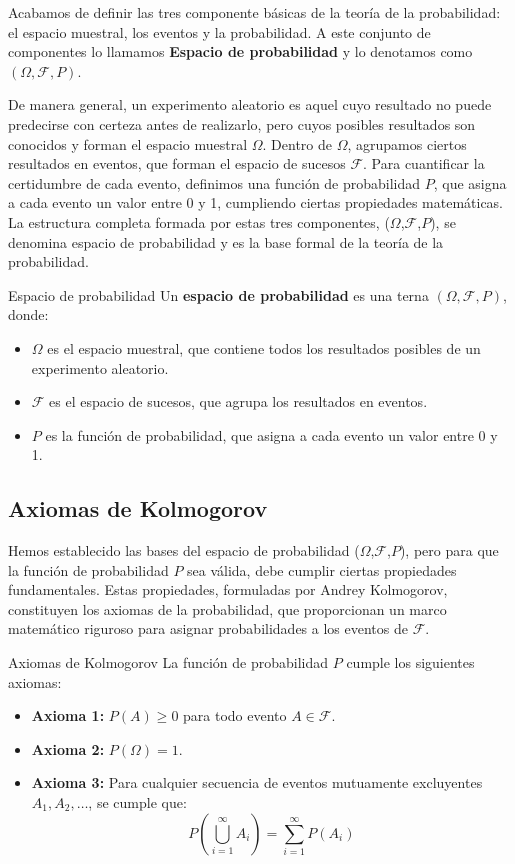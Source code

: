Acabamos de definir las tres componente básicas de la teoría de la probabilidad: el espacio muestral, los eventos y la probabilidad. A este
conjunto de componentes lo llamamos \textbf{Espacio de probabilidad} y lo denotamos como $(\Omega, \mathcal{F}, P)$.

De manera general, un experimento aleatorio es aquel cuyo resultado no puede predecirse con certeza antes de realizarlo, pero cuyos posibles resultados son conocidos y forman el espacio muestral $\Omega$. Dentro de $\Omega$, agrupamos ciertos resultados en eventos, que forman el espacio de sucesos $\mathcal{F}$. Para cuantificar la certidumbre de cada evento, definimos una función de probabilidad $P$, que asigna a cada evento un valor entre 0 y 1, cumpliendo ciertas propiedades matemáticas. La estructura completa formada por estas tres componentes, ($\Omega$,$\mathcal{F}$,$P$), se denomina espacio de probabilidad y es la base formal de la teoría de la probabilidad.

\begin{definicion}{Espacio de probabilidad}
Un \textbf{espacio de probabilidad} es una terna $(\Omega, \mathcal{F}, P)$, donde:

\begin{itemize}
    \item $\Omega$ es el espacio muestral, que contiene todos los resultados posibles de un experimento aleatorio.
    \item $\mathcal{F}$ es el espacio de sucesos, que agrupa los resultados en eventos.
    \item $P$ es la función de probabilidad, que asigna a cada evento un valor entre 0 y 1. 
\end{itemize}
\end{definicion}

\subsection{Axiomas de Kolmogorov}

Hemos establecido las bases del espacio de probabilidad ($\Omega$,$\mathcal{F}$,$P$), pero para que la función de probabilidad $P$ sea válida, debe cumplir ciertas propiedades fundamentales. Estas propiedades, formuladas por Andrey Kolmogorov, constituyen los axiomas de la probabilidad, que proporcionan un marco matemático riguroso para asignar probabilidades a los eventos de $\mathcal{F}$.

\begin{definicion}{Axiomas de Kolmogorov}
La función de probabilidad $P$ cumple los siguientes axiomas:

\begin{itemize}
    \item \textbf{Axioma 1:} $P(A) \geq 0$ para todo evento $A \in \mathcal{F}$.
    \item \textbf{Axioma 2:} $P(\Omega) = 1$.
    \item \textbf{Axioma 3:} Para cualquier secuencia de eventos mutuamente excluyentes $A_1, A_2, \ldots$, se cumple que:
    $$
    P\left(\bigcup_{i=1}^{\infty} A_i\right) = \sum_{i=1}^{\infty} P(A_i)
    $$ 
\end{itemize}
\end{definicion}

